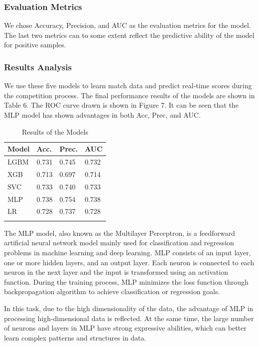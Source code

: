 \documentclass{mcmthesis}
\begin{document}
\subsubsection{Evaluation Metrics}

We chose Accuracy, Precision, and AUC as the evaluation metrics for the model. The last two metrics can to some extent reflect the predictive ability of the model for positive samples. 

\subsubsection{Results Analysis}

We use these five models to learn match data and predict real-time scores during the competition process. The final performance results of the models are shown in Table 6. The ROC curve drawn is shown in Figure 7. It can be seen that the MLP model has shown advantages in both Acc, Prec, and AUC.

\begin{longtable}[c]{llll}
	\toprule
	\textbf{Model} & \textbf{Acc}.  & \textbf{Prec}. & \textbf{AUC}   \\* \midrule
	\endfirsthead
	\endhead
	LGBM  & 0.731 & 0.745 & 0.732 \\* \midrule
	XGB   & 0.713 & 0.697 & 0.714 \\* \midrule
	SVC   & 0.733 & 0.740 & 0.733 \\* \midrule
	MLP   & 0.738 & 0.754 & 0.738 \\* \midrule
	LR    & 0.728 & 0.737 & 0.728 \\* \bottomrule
	\caption{Results of the Models}
	\label{tab:my-table}
\end{longtable}

The MLP model, also known as the Multilayer Perceptron, is a feedforward artificial neural network model mainly used for classification and regression problems in machine learning and deep learning. MLP consists of an input layer, one or more hidden layers, and an output layer. Each neuron is connected to each neuron in the next layer and the input is transformed using an activation function. During the training process, MLP minimizes the loss function through backpropagation algorithm to achieve classification or regression goals.

In this task, due to the high dimensionality of the data, the advantage of MLP in processing high-dimensional data is reflected. At the same time, the large number of neurons and layers in MLP have strong expressive abilities, which can better learn complex patterns and structures in data.
\end{document}
